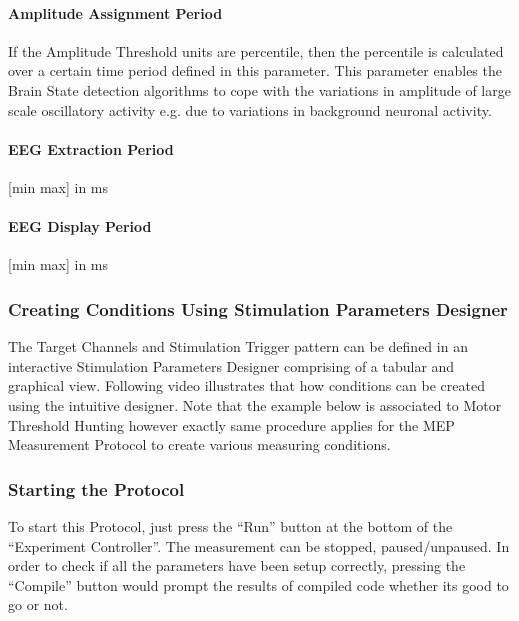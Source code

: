 \documentclass[letterpaper,10pt,english]{sphinxmanual}
\begin{document}
\paragraph{Amplitude Assignment Period}
\label{\detokenize{13_TUSIntervention:amplitude-assignment-period}}
\sphinxAtStartPar
If the Amplitude Threshold units are percentile, then the percentile is calculated over a certain time period defined in this parameter. This parameter enables the Brain State detection algorithms to cope with the variations in amplitude of large scale oscillatory activity e.g. due to variations in background neuronal activity.


\paragraph{EEG Extraction Period}
\label{\detokenize{13_TUSIntervention:eeg-extraction-period}}
\sphinxAtStartPar
{[}min max{]} in ms


\paragraph{EEG Display Period}
\label{\detokenize{13_TUSIntervention:eeg-display-period}}
\sphinxAtStartPar
{[}min max{]} in ms


\subsubsection{Creating Conditions Using Stimulation Parameters Designer}
\label{\detokenize{13_TUSIntervention:creating-conditions-using-stimulation-parameters-designer}}
\sphinxAtStartPar
The Target Channels and Stimulation Trigger pattern can be defined in an interactive Stimulation Parameters Designer comprising of a tabular and graphical view. Following video illustrates that how conditions can be created using the intuitive designer. Note that the example below is associated to Motor Threshold Hunting however exactly same procedure applies for the MEP Measurement Protocol to create various measuring conditions.


\subsubsection{Starting the Protocol}
\label{\detokenize{13_TUSIntervention:starting-the-protocol}}
\sphinxAtStartPar
To start this Protocol, just press the “Run” button at the bottom of the “Experiment Controller”. The measurement can be stopped, paused/unpaused. In order to check if all the parameters have been setup correctly, pressing the “Compile” button would prompt the results of compiled code whether its good to go or not.
\end{document}
